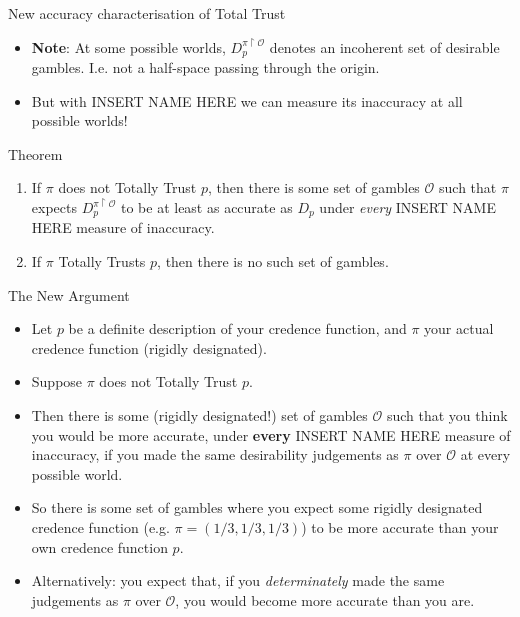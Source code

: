 \documentclass[aspectratio=169, dvipsnames]{beamer}
\newcommand{\Oset}{\mathcal{O}}
\begin{document}
\begin{frame}{New accuracy characterisation of Total Trust}
  \begin{itemize}
  \item \textbf{Note}: At some possible worlds, $D_p^{\pi \restriction \Oset}$ denotes an \alert{incoherent} set of desirable gambles. I.e.
    not a half-space passing through the origin.
  \item But with INSERT NAME HERE we can measure its inaccuracy at all possible worlds!
  \end{itemize}
  \begin{block}{Theorem}
    \begin{enumerate}
      \item If $\pi$ does not Totally Trust $p$, then there is some set of gambles $\Oset$ such that
        $\pi$ expects $D_p^{\pi \restriction \Oset}$ to be at least as accurate as $D_p$ under \textit{every}
        INSERT NAME HERE measure of inaccuracy.
      \item If $\pi$ Totally Trusts $p$, then there is no such set of gambles.
    \end{enumerate}
  \end{block}
\end{frame}

\begin{frame}{The New Argument}
  \begin{itemize}
  \item Let $p$ be a definite description of your credence function, and $\pi$ your actual credence function (rigidly designated).
  \item Suppose $\pi$ does not Totally Trust $p$.
  \item Then there is some (rigidly designated!) set of gambles $\Oset$ such that you think you would be more accurate,
    under \textbf{\alert{every}} INSERT NAME HERE measure of inaccuracy, if you made the same desirability judgements
    as $\pi$ over $\Oset$ at every possible world.
  \item So there is some set of gambles where you expect some rigidly designated credence function (e.g. $\pi=(1/3, 1/3, 1/3)$)
    to be more accurate than your own credence function $p$.
  \item Alternatively: you expect that, if you \textit{determinately} made the same judgements as $\pi$ over $\Oset$, you
    would become more accurate than you are.
  \end{itemize}
\end{frame}
\end{document}
